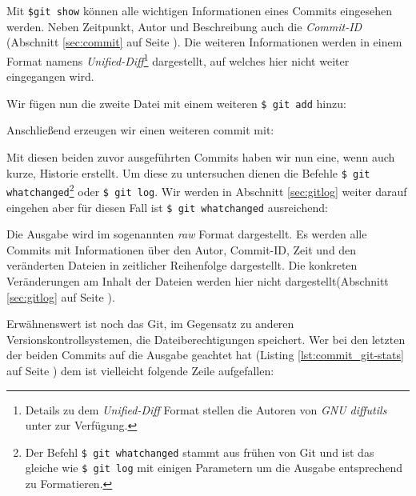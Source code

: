 

Mit \texttt{\$git show} können alle wichtigen Informationen eines Commits
eingesehen werden.  Neben Zeitpunkt, Autor und Beschreibung auch die
\textit{Commit-ID} (Abschnitt \ref{sec:commit} auf Seite \pageref{sec:commit}).
Die weiteren Informationen werden in einem Format namens
\textit{Unified-Diff}\footnote{Details zu dem \textit{Unified-Diff} Format
stellen die Autoren von \textit{GNU diffutils} unter
\cite[S.~12-13]{paper:diffutils} zur Verfügung.} dargestellt, auf welches hier
nicht weiter eingegangen wird.\cite[25]{gitops}

Wir fügen nun die zweite Datei mit einem weiteren \texttt{\$ git add} hinzu:



Anschließend erzeugen wir einen weiteren \gls{commit} mit:



Mit diesen beiden zuvor ausgeführten Commits haben wir nun eine, wenn auch
kurze, Historie erstellt. Um diese zu untersuchen dienen die Befehle \texttt{\$
git whatchanged}\footnote{Der Befehl \texttt{\$ git whatchanged} stammt aus
frühen von Git und ist das gleiche wie \texttt{\$ git log} mit einigen
Parametern um die Ausgabe entsprechend zu Formatieren.} oder \texttt{\$ git
log}. Wir werden in Abschnitt \ref{sec:gitlog} weiter darauf eingehen aber für
diesen Fall ist \texttt{\$ git whatchanged} ausreichend:



Die Ausgabe wird im sogenannten \textit{raw} Format dargestellt. Es werden alle
Commits mit Informationen über den Autor, Commit-ID, Zeit und den veränderten
Dateien in zeitlicher Reihenfolge dargestellt. Die konkreten Veränderungen am
Inhalt der Dateien werden hier nicht dargestellt(Abschnitt \ref{sec:gitlog} auf
Seite \pageref{sec:gitlog}).

Erwähnenswert ist noch das Git, im Gegensatz zu anderen
Versionskontrollsystemen, die Dateiberechtigungen speichert. Wer bei den
letzten der beiden Commits auf die Ausgabe geachtet hat (Listing
\ref{lst:commit_git-stats} auf Seite \pageref{lst:commit_git-stats}) dem ist
vielleicht folgende Zeile aufgefallen:

